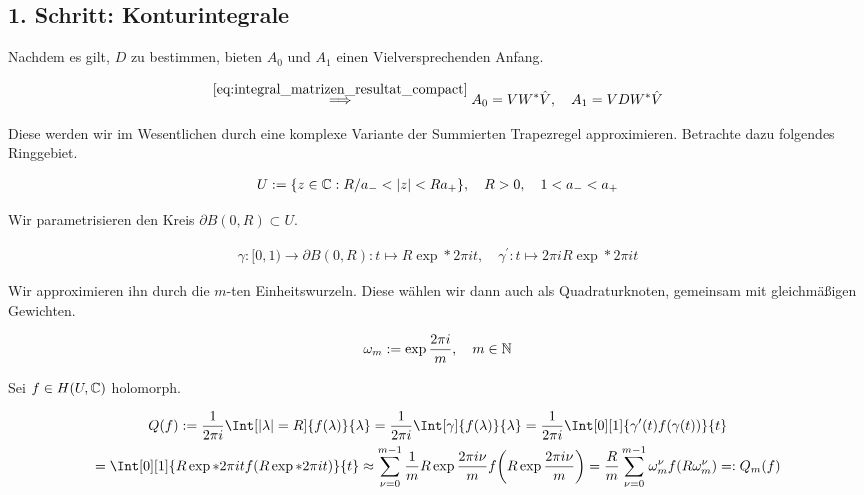 \subsection*{1. Schritt: Konturintegrale}

Nachdem es gilt, $D$ zu bestimmen, bieten $A_0$ und $A_1$ einen Vielversprechenden Anfang.

\begin{align} \label{eq:integral_matrizen_resultat}
    \stackrel
    {
        \eqref{eq:integral_matrizen_resultat_compact}
    }{\implies}
    A_0 = V W^\ast \hat V,
    \quad
    A_1 = V D W^\ast \hat V
\end{align}

Diese werden wir im Wesentlichen durch eine komplexe Variante der Summierten Trapezregel approximieren.
Betrachte dazu folgendes Ringgebiet.

\begin{align*}
    U := {\left \{ z \in \mathbb{C}: R / a_- < |z| < R a_+ \right \}},
    \quad
    R > 0,
    \quad
    1 < a_- < a_+
\end{align*}

Wir parametrisieren den Kreis $\partial B(0, R) \subset U$.

\begin{align*}
    \gamma: [0, 1) \to \partial B(0, R): t \mapsto R \exp*{2 \pi i t},
    \quad
    \gamma^\prime: t \mapsto 2 \pi i R \exp*{2 \pi i t}
\end{align*}

Wir approximieren ihn durch die $m$-ten Einheitswurzeln.
Diese wählen wir dann auch als Quadraturknoten, gemeinsam mit gleichmäßigen Gewichten.

\begin{align*}
    \omega_m := \exp \frac{2 \pi i}{m},
    \quad
    m \in \mathbb{N}
\end{align*}

Sei $f \in H(U, \mathbb{C})$ holomorph.

\begin{multline*}
    Q(f)
    :=
    \frac{1}{2 \pi i}
    \Int[|\lambda| = R]
    {
        f(\lambda)
    }{\lambda}
    =
    \frac{1}{2 \pi i}
    \Int[\gamma]
    {
        f(\lambda)
    }{\lambda}
    =
    \frac{1}{2 \pi i}
    \Int[0][1]
    {
        \gamma^\prime(t)
        f(\gamma(t))
    }{t} \\
    =
    \Int[0][1]
    {
        R
        \exp*{2 \pi i t}
        f(R \exp*{2 \pi i t})
    }{t}
    \approx
    \sum_{\nu = 0}^{m-1}
        \frac{1}{m}
        R \exp \frac{2 \pi i \nu}{m}
        f
        \pbraces
        {
            R \exp \frac{2 \pi i \nu}{m}
        }
    =
    \frac{R}{m}
    \sum_{\nu = 0}^{m-1}
        \omega_m^\nu
        f(R \omega_m^\nu)
    =:
    Q_m(f)
\end{multline*}


